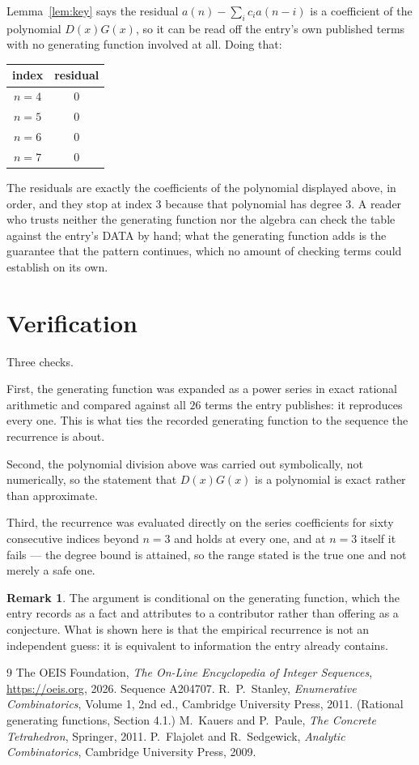 \documentclass[11pt,a4paper]{article}
\theoremstyle{plain}
\theoremstyle{definition}
\newtheorem{remark}[theorem]{Remark}
\begin{document}
Lemma~\ref{lem:key} says the residual $a(n)-\sum_ic_ia(n-i)$ is a coefficient of the
polynomial $D(x)G(x)$, so it can be read off the entry's own published terms with no
generating function involved at all. Doing that:
\begin{center}
\begin{tabular}{cc}
index & residual \\ \hline
$n=4$ & $0$ \\
$n=5$ & $0$ \\
$n=6$ & $0$ \\
$n=7$ & $0$
\end{tabular}
\end{center}
The residuals are exactly the coefficients of the polynomial displayed above, in order, and
they stop at index $3$ because that polynomial has degree $3$. A reader who trusts
neither the generating function nor the algebra can check the table against the entry's DATA
by hand; what the generating function adds is the guarantee that the pattern continues, which
no amount of checking terms could establish on its own.

\section{Verification}

Three checks.

First, the generating function was expanded as a power series in exact rational arithmetic and
compared against all $26$ terms the entry publishes: it reproduces every one. This is
what ties the recorded generating function to the sequence the recurrence is about.

Second, the polynomial division above was carried out symbolically, not numerically, so the
statement that $D(x)G(x)$ is a polynomial is exact rather than approximate.

Third, the recurrence was evaluated directly on the series coefficients for sixty consecutive
indices beyond $n=3$ and holds at every one, and at $n=3$ itself it fails --- the
degree bound is attained, so the range stated is the true one and not merely a safe one.

\begin{remark}
The argument is conditional on the generating function, which the entry records as a fact and
attributes to a contributor rather than offering as a conjecture. What is shown here is that
the empirical recurrence is not an independent guess: it is equivalent to information the
entry already contains.
\end{remark}

\begin{thebibliography}{9}
 The OEIS Foundation, \emph{The On-Line Encyclopedia of Integer
Sequences}, \url{https://oeis.org}, 2026. Sequence A204707.
 R.~P.~Stanley, \emph{Enumerative Combinatorics}, Volume 1, 2nd ed.,
Cambridge University Press, 2011. (Rational generating functions, Section 4.1.)
 M.~Kauers and P.~Paule, \emph{The Concrete Tetrahedron}, Springer, 2011.
 P.~Flajolet and R.~Sedgewick, \emph{Analytic Combinatorics}, Cambridge
University Press, 2009.
\end{thebibliography}
\end{document}
